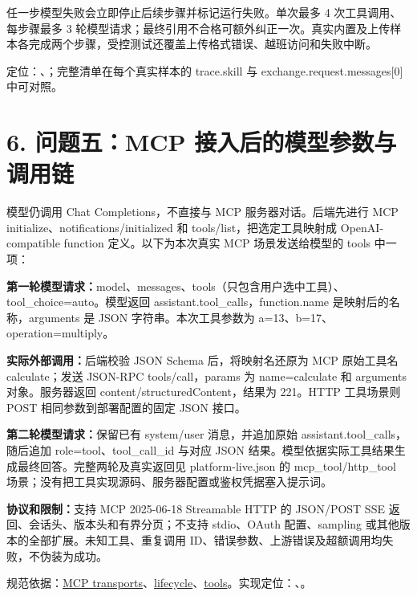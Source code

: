 \documentclass[UTF8,a4paper,10pt,fontset=fandol]{ctexart}
\begin{document}
任一步模型失败会立即停止后续步骤并标记运行失败。单次最多 4 次工具调用、每步骤最多 3 轮模型请求；最终引用不合格可额外纠正一次。真实内置及上传样本各完成两个步骤，受控测试还覆盖上传格式错误、越班访问和失败中断。

定位：、；完整清单在每个真实样本的 trace.skill 与 exchange.request.messages[0] 中可对照。

\newpage
\section*{6. 问题五：MCP 接入后的模型参数与调用链}
模型仍调用 Chat Completions，不直接与 MCP 服务器对话。后端先进行 MCP initialize、notifications/initialized 和 tools/list，把选定工具映射成 OpenAI-compatible function 定义。以下为本次真实 MCP 场景发送给模型的 tools 中一项：

\textbf{第一轮模型请求：}model、messages、tools（只包含用户选中工具）、tool\_choice=auto。模型返回 assistant.tool\_calls，function.name 是映射后的名称，arguments 是 JSON 字符串。本次工具参数为 a=13、b=17、operation=multiply。

\textbf{实际外部调用：}后端校验 JSON Schema 后，将映射名还原为 MCP 原始工具名 calculate；发送 JSON-RPC tools/call，params 为 name=calculate 和 arguments 对象。服务器返回 content/structuredContent，结果为 221。HTTP 工具场景则 POST 相同参数到部署配置的固定 JSON 接口。

\textbf{第二轮模型请求：}保留已有 system/user 消息，并追加原始 assistant.tool\_calls，随后追加 role=tool、tool\_call\_id 与对应 JSON 结果。模型依据实际工具结果生成最终回答。完整两轮及真实返回见 platform-live.json 的 mcp\_tool/http\_tool 场景；没有把工具实现源码、服务器配置或鉴权凭据塞入提示词。

\textbf{协议和限制：}支持 MCP 2025-06-18 Streamable HTTP 的 JSON/POST SSE 返回、会话头、版本头和有界分页；不支持 stdio、OAuth 配置、sampling 或其他版本的全部扩展。未知工具、重复调用 ID、错误参数、上游错误及超额调用均失败，不伪装为成功。

规范依据：\href{https://modelcontextprotocol.io/specification/2025-06-18/basic/transports}{MCP transports}、\href{https://modelcontextprotocol.io/specification/2025-06-18/basic/lifecycle}{lifecycle}、\href{https://modelcontextprotocol.io/specification/2025-06-18/server/tools}{tools}。实现定位：、。
\end{document}
